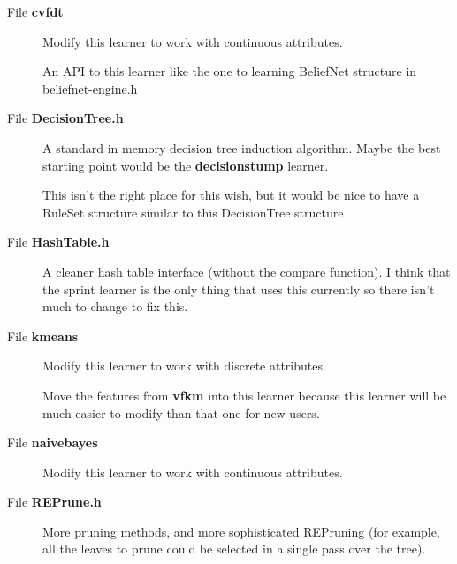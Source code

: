 \label{_wish000009}
 \begin{description}
\item[File {\bf cvfdt} ]Modify this learner to work with continuous attributes. 

An API to this learner like the one to learning Belief\-Net structure in beliefnet-engine.h \end{description}


\label{_wish000003}
 \begin{description}
\item[File {\bf Decision\-Tree.h} ]A standard in memory decision tree induction algorithm. Maybe the best starting point would be the {\bf decisionstump} learner. 

This isn't the right place for this wish, but it would be nice to have a Rule\-Set structure similar to this Decision\-Tree structure \end{description}


\label{_wish000005}
 \begin{description}
\item[File {\bf Hash\-Table.h} ]A cleaner hash table interface (without the compare function). I think that the sprint learner is the only thing that uses this currently so there isn't much to change to fix this. \end{description}


\label{_wish000010}
 \begin{description}
\item[File {\bf kmeans} ]Modify this learner to work with discrete attributes. 

Move the features from {\bf vfkm} into this learner because this learner will be much easier to modify than that one for new users. \end{description}


\label{_wish000012}
 \begin{description}
\item[File {\bf naivebayes} ]Modify this learner to work with continuous attributes. \end{description}


\label{_wish000004}
 \begin{description}
\item[File {\bf REPrune.h} ]More pruning methods, and more sophisticated REPruning (for example, all the leaves to prune could be selected in a single pass over the tree). \end{description}


